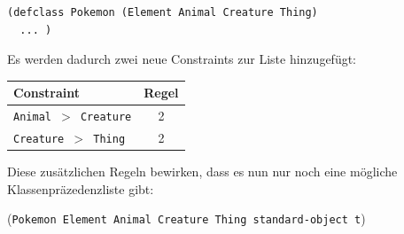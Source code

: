 \begin{lstlisting}
(defclass Pokemon (Element Animal Creature Thing)
  ... )
\end{lstlisting}

Es werden dadurch zwei neue Constraints zur Liste hinzugefügt:

\begin{tabular}{l|c}
 \textbf{Constraint} & \textbf{Regel}\\
 \hline
 \texttt{Animal $>$ Creature} & 2\\
 \texttt{Creature $>$ Thing}  & 2\\
\end{tabular}

Diese zusätzlichen Regeln bewirken, dass es nun nur noch eine mögliche Klassenpräzedenzliste gibt:

(\texttt{Pokemon Element Animal Creature Thing standard-object t})\\





